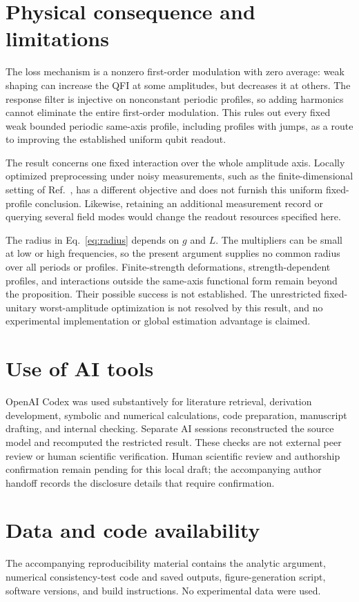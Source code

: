 \documentclass[aps,pra,reprint,amsmath,amssymb,nofootinbib,floatfix]{revtex4-2}
\begin{document}
\section{Physical consequence and limitations}

The loss mechanism is a nonzero first-order modulation with zero average:
weak shaping can increase the QFI at some amplitudes, but decreases it at
others. The response filter is injective on nonconstant periodic profiles,
so adding harmonics cannot eliminate the entire first-order modulation.
This rules out every fixed weak bounded periodic same-axis profile,
including profiles with jumps, as a route to improving the established
uniform qubit readout.

The result concerns one fixed interaction over the whole amplitude axis.
Locally optimized preprocessing under noisy measurements, such as the
finite-dimensional setting of Ref.~\cite{zhou2023}, has a different
objective and does not furnish this uniform fixed-profile conclusion.
Likewise, retaining an additional measurement record or querying several
field modes would change the readout resources specified here.

The radius in Eq.~\eqref{eq:radius} depends on $g$ and $L$.
The multipliers can be small at low or high frequencies, so the present
argument supplies no common radius over all periods or profiles.
Finite-strength deformations, strength-dependent profiles, and interactions
outside the same-axis functional form remain beyond the proposition.
Their possible success is not established. The unrestricted fixed-unitary
worst-amplitude optimization is not resolved by this result, and no
experimental implementation or global estimation advantage is claimed.

\section*{Use of AI tools}

OpenAI Codex was used substantively for literature retrieval, derivation
development, symbolic and numerical calculations, code preparation,
manuscript drafting, and internal checking. Separate AI sessions
reconstructed the source model and recomputed the restricted result.
These checks are not external peer review or human scientific verification.
Human scientific review and authorship confirmation remain pending for
this local draft; the accompanying author handoff records the disclosure
details that require confirmation.

\section*{Data and code availability}

The accompanying reproducibility material contains the analytic argument,
numerical consistency-test code and saved outputs, figure-generation
script, software versions, and build instructions. No experimental data
were used.



\end{document}
